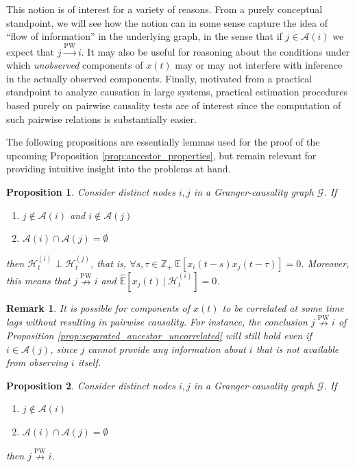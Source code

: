 \documentclass{statsoc}
\def\pwgc{\overset{\text{PW}}{\rightarrow}}  %
\def\npwgc{\overset{\text{PW}}{\nrightarrow}}  %
\def\gcg{\mathcal{G}}  %
\def\H{\mathcal{H}}  %
\newcommand{\linE}[2]{\hat{\E}[#1\ |\ #2]}  %
\newcommand{\anc}[1]{\mathcal{A}(#1)}  %
\newtheorem{proposition}{Proposition}
\newtheorem{remark}{Remark}
\def\H{\mathcal{H}}  %
\def\E{\mathbb{E}}  %
\def\Z{\mathbb{Z}}  %
\begin{document}
This notion is of interest for a variety of reasons.  From a purely
conceptual standpoint, we will see how the notion can in some sense
capture the idea of ``flow of information'' in the underlying graph,
in the sense that if $j \in \anc{i}$ we expect that $j \pwgc i$.  It may
also be useful for reasoning about the conditions under which
\textit{unobserved} components of $x(t)$ may or may not interfere with
inference in the actually observed components.  Finally, motivated
from a practical standpoint to analyze causation in large systems,
practical estimation procedures based purely on pairwise causality
tests are of interest since the computation of such pairwise relations
is substantially easier.

The following propositions are essentially lemmas used for the proof
of the upcoming Proposition \ref{prop:ancestor_properties}, but
remain relevant for providing intuitive insight into the problems at
hand.

\begin{proposition}
  Consider distinct nodes $i, j$ in a Granger-causality graph
  $\gcg$.  If

  \begin{enumerate}[label=(\alph*)]
    \item{$j \not\in \anc{i}$ and $i \not\in \anc{j}$}
    \item{$\anc{i}\cap\anc{j} = \emptyset$}
  \end{enumerate}

  then $\H_t^{(i)} \perp \H_t^{(j)}$, that is,
  $\forall s, \tau \in \Z_+\ \E[x_i(t - s)x_j(t - \tau)] = 0$.  Moreover,
  this means that $j \npwgc i$ and $\linE{x_j(t)}{\H_t^{(i)}} = 0$.
\end{proposition}

\begin{remark}
  It is possible for components of $x(t)$ to be correlated at some
  time lags without resulting in pairwise causality.  For instance,
  the conclusion $j \npwgc i$ of Proposition
  \ref{prop:separated_ancestor_uncorrelated} will still hold even if
  $i \in \anc{j}$, since $j$ cannot provide any information about $i$
  that is not available from observing $i$ itself.
\end{remark}

\begin{proposition}
  Consider distinct nodes $i, j$ in a Granger-causality graph $\gcg$.
  If

  \begin{enumerate}[label=(\alph*)]
    \item{$j \not\in \anc{i}$}
    \item{$\anc{i}\cap\anc{j} = \emptyset$}
  \end{enumerate}

  then $j \npwgc i$.
\end{proposition}
\end{document}
